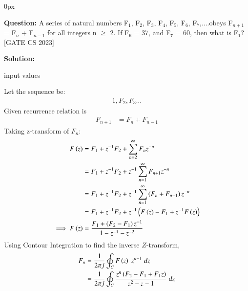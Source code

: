 \documentclass[journal,12pt]{IEEEtran}
\begin{document}
	\parindent 0px
	
	
	\vspace{3cm}
	
	\title{}
	\author{EE23BTECH11209 - K S Ballvardhan$^{*}$
	}
	\maketitle
	\newpage
	\bigskip
	
	
	
	
	
	\textbf{Question:} A series of natural numbers F$_1$, F$_2$, F$_3$, F$_4$, F$_5$, F$_6$, F$_7$,....obeys F$_{n+1}$ = F$_n$ + F$_{n-1}$ for all integers n $\geq$ 2.
	If F$_6$ = 37, and F$_7$ = 60, then what is F$_1$? \hfill[GATE CS 2023]
	
	\textbf{Solution: }
	
	\begin{table}[ht] 
		\centering
		
		\caption{input values}
		\label{tab: Table2022cs36}
	\end{table}
	
	Let the sequence be:
	\begin{align}
	1, F_2, F_3 \dots
	\end{align}
	Given recurrence relation is
	\begin{align}
	F_{n+1} &= F_n + F_{n-1}
	\end{align}
    Taking z-transform of $ F_n$:
	\begin{align}
		F\left(z\right) &= F_1 + z^{-1} F_2 + \sum_{n=2}^{\infty} F_n z^{-n}\\
	    &= F_1 + z^{-1} F_2 + z^{-1} \sum_{n=1}^{\infty} F_{n+1} z^{-n}\\
	    &= F_1 + z^{-1} F_2 + z^{-1} \sum_{n=1}^{\infty} \left(F_n + F_{n-1}\right)z^{-n}\\
	    &= F_1 + z^{-1} F_2 + z^{-1}\left(F\left(z\right)-F_1 + z^{-1}F\left(z\right)\right)\\
		\implies F\left(z\right)&= \frac{F_1 + \left(F_2-F_1\right)z^{-1}}{1-z^{-1}-z^{-2}}
	\end{align}
	Using Contour Integration to find the inverse $Z$-transform,
	\begin{align}
		F_{n}&=\frac{1}{2\pi j}\oint_{C} F\left(z\right) \;z^{n-1} \;dz  \\
		&=\frac{1}{2\pi j}\oint_{C}\frac{z^{n}\left(F_2-F_1+F_1 z\right)}{z^2-z-1} \;dz 
	\end{align}
	
\end{document}

